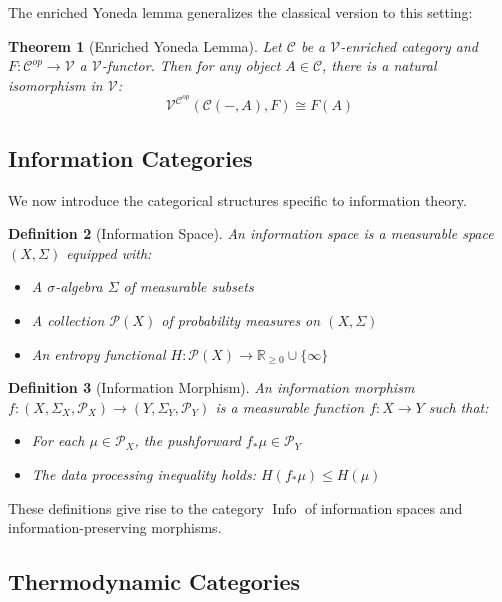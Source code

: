 \documentclass[12pt]{article}
\newtheorem{theorem}{Theorem}[section]
\newtheorem{definition}[theorem]{Definition}
\DeclareMathOperator{\Info}{Info}
\begin{document}
The enriched Yoneda lemma generalizes the classical version to this setting:

\begin{theorem}[Enriched Yoneda Lemma]
Let $\mathcal{C}$ be a $\mathcal{V}$-enriched category and $F: \mathcal{C}^{op} \to \mathcal{V}$ a $\mathcal{V}$-functor. Then for any object $A \in \mathcal{C}$, there is a natural isomorphism in $\mathcal{V}$:
\[\mathcal{V}^{\mathcal{C}^{op}}(\mathcal{C}(-,A), F) \cong F(A)\]
\end{theorem}

\subsection{Information Categories}

We now introduce the categorical structures specific to information theory.

\begin{definition}[Information Space]
An information space is a measurable space $(X, \Sigma)$ equipped with:
\begin{itemize}
\item A $\sigma$-algebra $\Sigma$ of measurable subsets
\item A collection $\mathcal{P}(X)$ of probability measures on $(X, \Sigma)$
\item An entropy functional $H: \mathcal{P}(X) \to \mathbb{R}_{\geq 0} \cup \{\infty\}$
\end{itemize}
\end{definition}

\begin{definition}[Information Morphism]
An information morphism $f: (X, \Sigma_X, \mathcal{P}_X) \to (Y, \Sigma_Y, \mathcal{P}_Y)$ is a measurable function $f: X \to Y$ such that:
\begin{itemize}
\item For each $\mu \in \mathcal{P}_X$, the pushforward $f_*\mu \in \mathcal{P}_Y$
\item The data processing inequality holds: $H(f_*\mu) \leq H(\mu)$
\end{itemize}
\end{definition}

These definitions give rise to the category $\Info$ of information spaces and information-preserving morphisms.

\subsection{Thermodynamic Categories}
\end{document}

